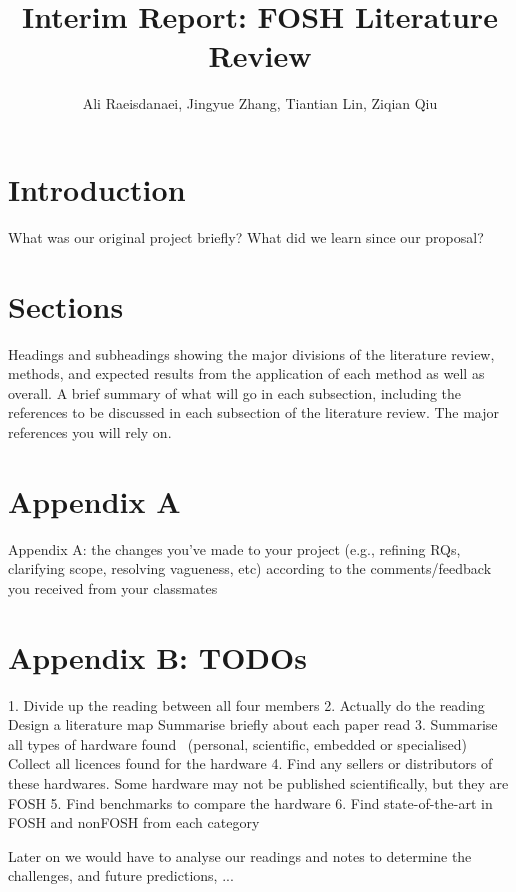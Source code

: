 \documentclass{article}
\begin{document}


\title{Interim Report: FOSH Literature Review}
\author{Ali Raeisdanaei, Jingyue Zhang, Tiantian Lin, Ziqian Qiu }
\date{}
\maketitle

\section{Introduction}

What was our original project briefly?
What did we learn since our proposal? 

\section{Sections}
Headings and subheadings showing the major divisions of the literature review, methods, and expected results from the application of each method as well as overall.
A brief summary of what will go in each subsection, including the references to be discussed in each subsection of the literature review.
The major references you will rely on.

\section{Appendix A}
Appendix A: the changes you've made to your project 
(e.g., refining RQs, clarifying scope, resolving vagueness, etc) 
according to the comments/feedback you received from your classmates


\section{Appendix B: TODOs}

1. Divide up the reading between all four members
2. Actually do the reading
    Design a literature map
    Summarise briefly about each paper read
3. Summarise all types of hardware found
    ~(personal, scientific, embedded or specialised)
    Collect all licences found for the hardware
4. Find any sellers or distributors of these hardwares.
    Some hardware may not be published scientifically, but they are FOSH
5. Find benchmarks to compare the hardware
6. Find state-of-the-art in FOSH and nonFOSH from each category

Later on we would have to analyse our readings and notes to determine the challenges, and future predictions, ...


\nocite{*}
\printbibliography
\end{document}
